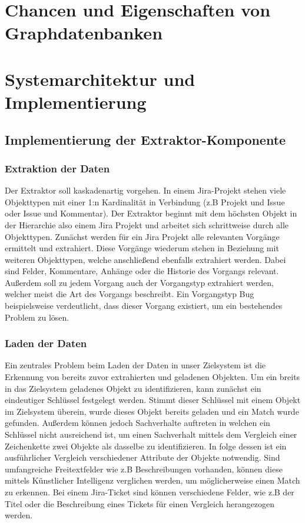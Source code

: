 \documentclass[10pt]{article}
\begin{document}
\section{Chancen und Eigenschaften von Graphdatenbanken}
\newpage
\section{Systemarchitektur und Implementierung}
\subsection{Implementierung der Extraktor-Komponente}
\subsubsection{Extraktion der Daten}
Der Extraktor soll kaskadenartig vorgehen. In einem Jira-Projekt stehen viele Objekttypen mit einer 1:n Kardinalität in Verbindung (z.B Projekt und Issue oder Issue und Kommentar). Der Extraktor beginnt mit dem höchsten Objekt in der Hierarchie also einem Jira Projekt und arbeitet sich schrittweise durch alle Objekttypen. Zunächst werden für ein Jira Projekt alle relevanten Vorgänge ermittelt und extrahiert. Diese Vorgänge wiederum stehen in Beziehung mit weiteren Objekttypen, welche anschließend ebenfalls extrahiert werden. Dabei sind Felder, Kommentare, Anhänge oder die Historie des Vorgangs relevant. Außerdem soll zu jedem Vorgang auch der Vorgangstyp extrahiert werden, welcher meist die Art des Vorgangs beschreibt. Ein Vorgangstyp Bug beispielsweise verdeutlicht, dass dieser Vorgang existiert, um ein bestehendes Problem zu lösen.
\subsubsection{Laden der Daten}
Ein zentrales Problem beim Laden der Daten in unser Zielsystem ist die Erkennung von bereits zuvor extrahierten und geladenen Objekten. Um ein breits in das Zielsystem geladenes Objekt zu identifizieren, kann zunächst ein eindeutiger Schlüssel festgelegt werden. Stimmt dieser Schlüssel mit einem Objekt im Zielsystem überein, wurde dieses Objekt bereits geladen und ein Match wurde gefunden. Außerdem können jedoch Sachverhalte auftreten in welchen ein Schlüssel nicht ausreichend ist, um einen Sachverhalt mittels dem Vergleich einer Zeichenkette zwei Objekte als dasselbe zu identifizieren. In folge dessen ist ein ausführlicher Vergleich verschiedener Attribute der Objekte notwendig. Sind umfangreiche Freitextfelder wie z.B Beschreibungen vorhanden, können diese mittels Künstlicher Intelligenz verglichen werden, um möglicherweise einen Match zu erkennen. Bei einem Jira-Ticket sind können verschiedene Felder, wie z.B der Titel oder die Beschreibung eines Tickets für einen Vergleich herangezogen werden.
\end{document}
